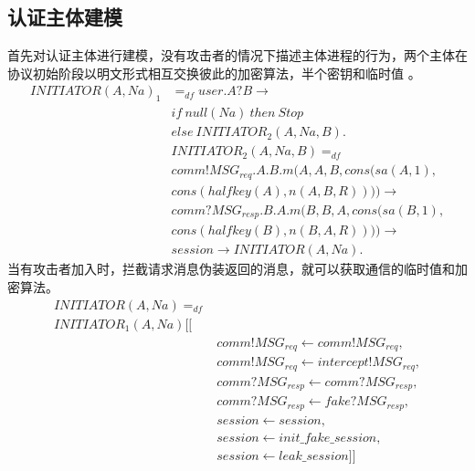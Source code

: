 \documentclass[UTF8]{ctexart}
\begin{document}
\subsection{认证主体建模}
\par{
	 首先对认证主体进行建模，没有攻击者的情况下描述主体进程的行为，两个主体在协议初始阶段以明文形式相互交换彼此的加密算法，半个密钥和临时值
	 。
	 \begin{equation}
		\begin{aligned}
			INITIATOR(A,Na)_{1} &=_{df} user.A?B \rightarrow \\
			& if \ null(Na) \   then \   Stop \\
			& else  \  INITIATOR_{2}(A,Na,B). \\
			&INITIATOR_{2}(A,Na,B)=_{df} \\
			&comm!MSG_{req}.A.B.m(A,A,B,cons(sa(A,1),\\ 
			&cons(halfkey(A),n(A,B,R)))) \rightarrow \\
			&comm?MSG_{resp}.B.A.m(B,B,A,cons(sa(B,1), \\ 
			&cons(halfkey(B),n(B,A,R)))) \rightarrow \\
			&session \rightarrow INITIATOR(A,Na).
	\end{aligned}
	\end{equation}
	当有攻击者加入时，拦截请求消息伪装返回的消息，就可以获取通信的临时值和加密算法。
	\begin{equation}
		\begin{aligned}
			INITIATOR(A,Na)=_{df}\\
			INITIATOR_{1}(A,Na) [[ \\
			&comm!MSG_{req} \leftarrow comm!MSG_{req}, \\
			&comm!MSG_{req} \leftarrow intercept!MSG_{req}, \\
			&comm?MSG_{resp} \leftarrow comm?MSG_{resp},\\
			&comm?MSG_{resp} \leftarrow fake?MSG_{resp},\\
			&session \leftarrow session, \\
			&session \leftarrow init\_fake\_session, \\
			&session \leftarrow leak\_session]]
	\end{aligned}
	\end{equation}
}
\end{document}
